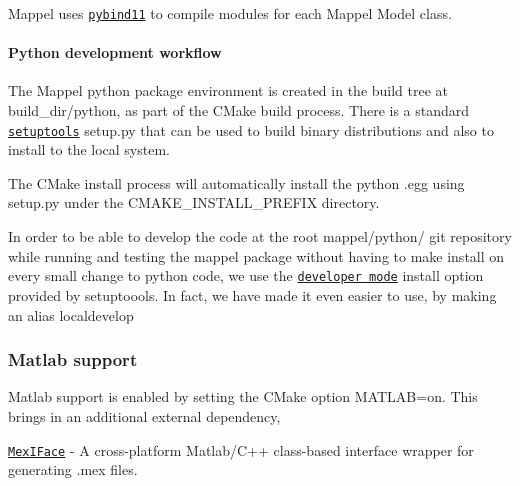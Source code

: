 Mappel uses \href{https://pybind11.readthedocs.io/en/stable/}{\tt pybind11} to compile modules for each Mappel Model class.

\paragraph*{Python development workflow}

The Mappel python package environment is created in the build tree at {\ttfamily build\+\_\+dir/python}, as part of the C\+Make build process. There is a standard \href{https://setuptools.readthedocs.io/en/latest/setuptools.html#}{\tt setuptools} {\ttfamily setup.\+py} that can be used to build binary distributions and also to install to the local system.

The C\+Make install process will automatically install the python .egg using {\ttfamily setup.\+py} under the {\ttfamily C\+M\+A\+K\+E\+\_\+\+I\+N\+S\+T\+A\+L\+L\+\_\+\+P\+R\+E\+F\+IX} directory.

In order to be able to develop the code at the root {\ttfamily mappel/python/} git repository while running and testing the mappel package without having to {\ttfamily make install} on every small change to python code, we use the \href{https://setuptools.readthedocs.io/en/latest/setuptools.html#development-mode}{\tt developer mode} install option provided by setuptoools. In fact, we have made it even easier to use, by making an alias {\ttfamily localdevelop}




\subsubsection*{Matlab support}

Matlab support is enabled by setting the C\+Make option {\ttfamily M\+A\+T\+L\+AB=on}. This brings in an additional external dependency,
\begin{DoxyItemize}
\item \href{https://github.com/markjolah/MexIFace}{\tt Mex\+I\+Face} -\/ A cross-\/platform Matlab/\+C++ class-\/based interface wrapper for generating .mex files.
\end{DoxyItemize}

